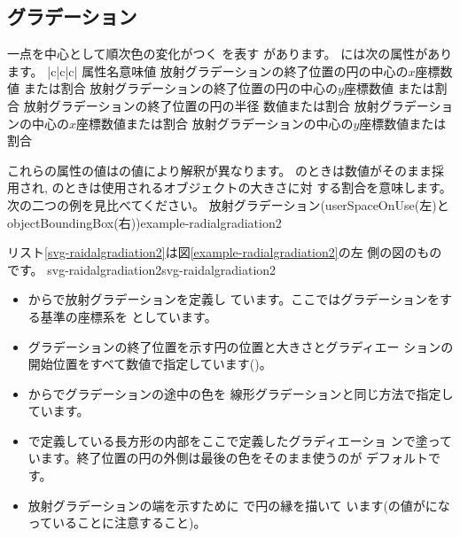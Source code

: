 \subsection{グラデーション}
一点を中心として順次色の変化がつく
を表す
があります。
%
には次の属性があります。
{|c|c|c|}{%
{属性名}{意味}{値}
{}{放射グラデーションの終了位置の円の中心の$x$座標}{数値
または割合}
{}{放射グラデーションの終了位置の円の中心の$y$座標}{数値
または割合}
{}{放射グラデーションの終了位置の円の半径 }{数値または割合}
{}{放射グラデーションの中心の$x$座標}{数値または割合}
{}{放射グラデーションの中心の$y$座標}{数値または割合}}

これらの属性の値はの値により解釈が異なります。
のときは数値がそのまま採用され, 
のときは使用されるオブジェクトの大きさに対
する割合を意味します。次の二つの例を見比べてください。
    {放射グラデーション(userSpaceOnUse(左)とobjectBoundingBox(右))}{example-radialgradiation2}

リスト\ref{svg-raidalgradiation2}は図\ref{example-radialgradiation2}の左
側の図のものです。
  {svg-raidalgradiation2}{svg-raidalgradiation2}
\begin{itemize}
 \item {}からで放射グラデーションを定義し
       ています。ここではグラデーションをする基準の座標系を
       としています。
 \item グラデーションの終了位置を示す円の位置と大きさとグラディエー
       ションの開始位置をすべて数値で指定しています()。
 \item {}からでグラデーションの途中の色を
       線形グラデーションと同じ方法で指定しています。
 \item {}で定義している長方形の内部をここで定義したグラディエーショ
       ンで塗っています。終了位置の円の外側は最後の色をそのまま使うのが
       デフォルトです。
 \item 放射グラデーションの端を示すために
で円の縁を描いて
います(の値がになっていることに注意すること)。
\end{itemize}

